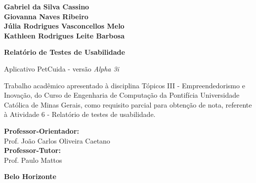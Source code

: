 \documentclass[
    12pt,
    openright,
    oneside,
    a4paper
]{abntex2}
\begin{document}
\begin{folhaderosto}
    \begin{center}

        {\large \textbf{Gabriel da Silva Cassino}} \\
        {\large \textbf{Giovanna Naves Ribeiro}} \\
        {\large \textbf{Júlia Rodrigues Vasconcellos Melo}} \\
        {\large \textbf{Kathleen Rodrigues Leite Barbosa}}

        \vfill

        {\Large \textbf{Relatório de Testes de Usabilidade}}

        \vspace{0.25cm}
        {\Large Aplicativo PetCuida - versão \textit{Alpha 3i}}

        \vfill

    \end{center}

    \begin{flushright}
        \begin{minipage}{8cm}
            \SingleSpacing
                {\small
                Trabalho acadêmico apresentado à disciplina
                Tópicos III - Empreendedorismo e Inovação,
                do Curso de Engenharia de Computação da
                Pontifícia Universidade Católica de Minas
                Gerais, como requisito parcial para obtenção
                de nota, referente à Atividade 6 - Relatório
                de testes de usabilidade.
                }

                \vspace{0.5cm}
                {\small
                \textbf{Professor-Orientador:} \\Prof. João Carlos Oliveira Caetano \\
                \textbf{Professor-Tutor:} \\Prof. Paulo Mattos
                }
            \OnehalfSpacing
        \end{minipage}
    \end{flushright}

    \vfill

    \begin{center}
        {\large \textbf{Belo Horizonte}} \\
        {\large \textbf{\the\year}}
    \end{center}

\end{folhaderosto}
\end{document}
